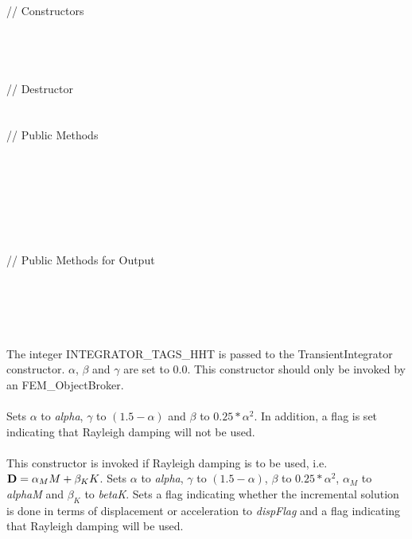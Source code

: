  \\
\indent // Constructors \\
\\ 
\\ 
\\ \\
\indent // Destructor \\
\\ \\
\indent // Public Methods \\
 \\
 \\
\\
\\
 \\ 
\\ \\
\indent // Public Methods for Output\\
\\ 
\\ 
\\

 \\
\\ 
The integer INTEGRATOR\_TAGS\_HHT is passed to the TransientIntegrator
constructor. $\alpha$, $\beta$ and $\gamma$ are set to 0.0. This
constructor should only be invoked by an FEM\_ObjectBroker. \\

\\ 
Sets $\alpha$ to {\em alpha}, $\gamma$ to $(1.5 - \alpha)$ and $\beta$
to $0.25*\alpha^2$. In addition, a flag is set indicating that Rayleigh
damping will not be used. \\

\\ 
This constructor is invoked if Rayleigh damping is to be used, 
i.e. ${\bf D} = \alpha_M M + \beta_K K$. Sets $\alpha$ to {\em alpha},
$\gamma$ to $(1.5 - \alpha)$, $\beta$ to $0.25*\alpha^2$, $\alpha_M$ to
{\em alphaM} and $\beta_K$ to {\em betaK}. Sets a flag indicating
whether the incremental solution is done in terms of displacement or
acceleration to {\em dispFlag} and a flag indicating that Rayleigh
damping will be used. \\ 

